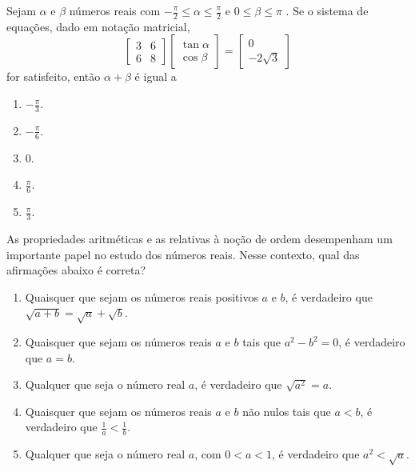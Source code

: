 \documentclass[twocolumn,landscape]{amsart}
\begin{document}
\begin{questao} 
  Sejam $\alpha$ e $\beta$ números reais com
  $-\frac{\pi}{2}\leq\alpha\leq\frac{\pi}{2}$ e $0\leq\beta\leq\pi$ . Se o
  sistema de equações, dado em notação matricial, \[
  \begin{bmatrix}
    3&6\\
    6&8
  \end{bmatrix}
  \begin{bmatrix}
    \tan\alpha\\\cos\beta
  \end{bmatrix} =
  \begin{bmatrix}
    0\\-2\sqrt{3}
  \end{bmatrix}\] for satisfeito, então $\alpha+\beta$ é igual a

  \begin{enumerate}[\bf a.]
    \item $-\frac{\pi}{3}$.
    \item $-\frac{\pi}{6}$. %
    \item $0$.
    \item $\frac{\pi}{6}$.
    \item $\frac{\pi}{3}$.
  \end{enumerate}
\end{questao}
\clearpage

\begin{questao}
  As propriedades aritméticas e as relativas à noção de ordem
  desempenham um importante papel no estudo dos números reais. Nesse
  contexto, qual das afirmações abaixo é correta?
  \begin{enumerate}[\bf a.]
    \item Quaisquer que sejam os números reais positivos $a$ e $b$, é
    verdadeiro que $\sqrt{a+b}=\sqrt{a}+\sqrt{b}$.
    \item Quaisquer que sejam os números reais $a$ e $b$ tais que
    $a^2-b^2=0$, é verdadeiro que $a=b$.
    \item Qualquer que seja o número real $a$, é verdadeiro que
    $\sqrt{a^2}=a$.
    \item Quaisquer que sejam os números reais $a$ e $b$ não nulos tais
    que $a<b$, é verdadeiro que $\frac{1}{a}<\frac{1}{b}$.
    \item Qualquer que seja o número real $a$, com $0<a<1$, é verdadeiro
    que $a^2<\sqrt{a}$. %
  \end{enumerate}
\end{questao}
\clearpage
\end{document}
